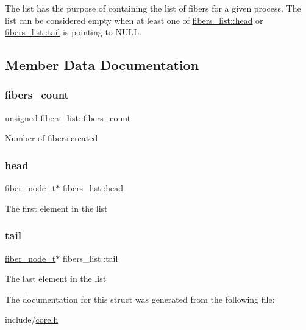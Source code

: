 The list has the purpose of containing the list of fibers for a given process. The list can be considered empty when at least one of \mbox{\hyperlink{structfibers__list_aa1dd39c8c192607d164f204821d5b3ed}{fibers\+\_\+list\+::head}} or \mbox{\hyperlink{structfibers__list_af94c6bcedeb27c078ea1fa4869c53673}{fibers\+\_\+list\+::tail}} is pointing to {\ttfamily N\+U\+LL}. 

\subsection{Member Data Documentation}
\mbox{\label{structfibers__list_a54a8a9f5a97c783b1461257d6e07aa1a}} 
\subsubsection{\texorpdfstring{fibers\+\_\+count}{fibers\_count}}
{\footnotesize\ttfamily unsigned fibers\+\_\+list\+::fibers\+\_\+count}

Number of fibers created \mbox{\label{structfibers__list_aa1dd39c8c192607d164f204821d5b3ed}} 
\subsubsection{\texorpdfstring{head}{head}}
{\footnotesize\ttfamily \mbox{\hyperlink{core_8h_adb14c8b48a1d56cf9c6632295ab90048}{fiber\+\_\+node\+\_\+t}}$\ast$ fibers\+\_\+list\+::head}

The first element in the list \mbox{\label{structfibers__list_af94c6bcedeb27c078ea1fa4869c53673}} 
\subsubsection{\texorpdfstring{tail}{tail}}
{\footnotesize\ttfamily \mbox{\hyperlink{core_8h_adb14c8b48a1d56cf9c6632295ab90048}{fiber\+\_\+node\+\_\+t}}$\ast$ fibers\+\_\+list\+::tail}

The last element in the list 

The documentation for this struct was generated from the following file\+:\begin{DoxyCompactItemize}
\item 
include/\mbox{\hyperlink{core_8h}{core.\+h}}\end{DoxyCompactItemize}

